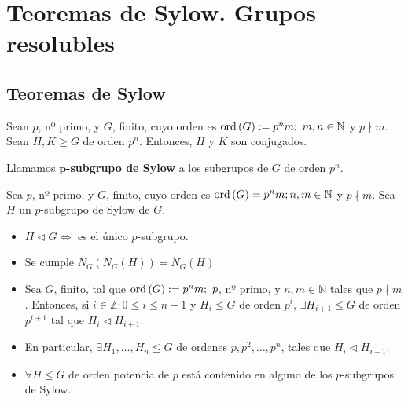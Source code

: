\chapter{Teoremas de Sylow. Grupos\\ resolubles}

\section{Teoremas de Sylow}
\begin{theo}
Sean $p$, nº primo, y $G$, finito, cuyo orden es $\operatorname{ord}\left( G \right) := p^n m;\ m, n \in \mathbb{N}$ y $p \nmid m$. Sean $H, K \ge G$ de orden $p^n$. Entonces, $H$ y $K$ son conjugados.
\end{theo}

\begin{defi}
Llamamos \textbf{$\mathbf{p}$-subgrupo de Sylow} a los subgrupos de $G$ de orden $p^n$.
\end{defi}

\begin{coro}
Sea $p$, nº primo, y $G$, finito, cuyo orden es $\operatorname{ord}\left( G \right) = p^n m; n, m \in \mathbb{N}$ y $p \nmid m$. Sea $H$ un $p$-subgrupo de Sylow de $G$.
\begin{itemize}
\item $H \triangleleft G \Leftrightarrow$ es el único $p$-subgrupo.
\item Se cumple $N_G\left( N_G\left( H \right) \right) = N_G\left( H \right)$
\end{itemize}
\end{coro}

\begin{theo}
\begin{itemize}
\item Sea $G$, finito, tal que $\operatorname{ord}\left( G \right) := p^nm;\ p$, nº primo, y $n, m \in \mathbb{N}$ tales que $p \nmid m$. Entonces, si $i \in \mathbb{Z}: 0 \le i \le n - 1$ y $H_i \le G$ de orden $p^i$, $\exists H_{i+1} \le G$ de orden $p^{i+1}$ tal que $H_i \triangleleft H_{i+1}$.

\item En particular, $\exists H_1, \ldots, H_{n} \le G$ de ordenes $p, p^2, \ldots, p^n$, tales que $H_i \triangleleft H_{i+1}$.

\item $\forall H \le G$ de orden potencia de $p$ está contenido en alguno de los $p$-subgrupos de Sylow.
\end{itemize}
\end{theo}

